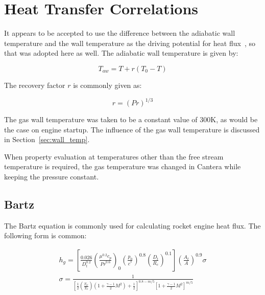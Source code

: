 \documentclass[11pt]{article}
\begin{document}
\section{Heat Transfer Correlations}\label{sec:heat_transfer}

It appears to be accepted to use the difference between the adiabatic wall temperature and the wall temperature as the driving potential for heat flux~\cite{huang_modern_1992, bartz_turbulent_1965, grisson_liquid_1991}, so that was adopted here as well. The adiabatic wall temperature is given by:

\begin{equation}
    T_{aw} = T + r(T_0 - T)
\end{equation}

The recovery factor $r$ is commonly given as:

\begin{equation}
    r = (Pr)^{1/3}
\end{equation}

The gas wall temperature was taken to be a constant value of 300K, as would be the case on engine startup. The influence of the gas wall temperature is discussed in Section~\ref{sec:wall_temp}.

When property evaluation at temperatures other than the free stream temperature is required, the gas temperature was changed in Cantera while keeping the pressure constant.

\subsection{Bartz}

The Bartz equation is commonly used for calculating rocket engine heat flux. The following form is common:

\begin{equation}
    \label{equation:bartz}
    \begin{split}
         h_g = \left[ \frac{0.026}{D_t^{0.2}} \left( \frac{\mu^{0.2} c_p}{{Pr}^{0.6}} \right)_{0} \left( \frac{p_0}{c^*} \right)^{0.8} \left( \frac{D_t}{R_c} \right)^{0.1} \right] \left( \frac{A_t}{A} \right)^{0.9} \sigma \\
         \sigma = \frac{1}{\left[ \frac{1}{2} \left( \frac{T_{w}}{T_0} \right) \left( 1 + \frac{\gamma - 1}{2} M^2 \right) + \frac{1}{2}\right]^{0.8-m/5} \left[ 1 + \frac{\gamma - 1}{2} M^2 \right]^{m/5}}
    \end{split}
\end{equation}
\end{document}
